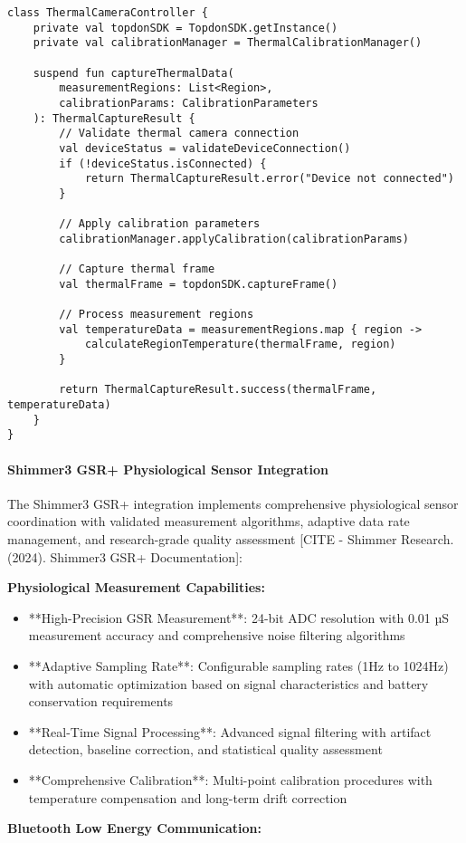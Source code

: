\documentclass[11pt,a4paper]{report}
\begin{document}
\begin{verbatim}
class ThermalCameraController {
    private val topdonSDK = TopdonSDK.getInstance()
    private val calibrationManager = ThermalCalibrationManager()

    suspend fun captureThermalData(
        measurementRegions: List<Region>,
        calibrationParams: CalibrationParameters
    ): ThermalCaptureResult {
        // Validate thermal camera connection
        val deviceStatus = validateDeviceConnection()
        if (!deviceStatus.isConnected) {
            return ThermalCaptureResult.error("Device not connected")
        }

        // Apply calibration parameters
        calibrationManager.applyCalibration(calibrationParams)

        // Capture thermal frame
        val thermalFrame = topdonSDK.captureFrame()

        // Process measurement regions
        val temperatureData = measurementRegions.map { region ->
            calculateRegionTemperature(thermalFrame, region)
        }

        return ThermalCaptureResult.success(thermalFrame, temperatureData)
    }
}
\end{verbatim}

\paragraph{Shimmer3 GSR+ Physiological Sensor Integration}

The Shimmer3 GSR+ integration implements comprehensive physiological sensor coordination with validated measurement
algorithms, adaptive data rate management, and research-grade quality
assessment [CITE - Shimmer Research. (2024). Shimmer3 GSR+ Documentation]:

\textbf{Physiological Measurement Capabilities:}

\begin{itemize}
\item **High-Precision GSR Measurement**: 24-bit ADC resolution with 0.01 µS measurement accuracy and comprehensive noise
  filtering algorithms
\item **Adaptive Sampling Rate**: Configurable sampling rates (1Hz to 1024Hz) with automatic optimization based on signal
  characteristics and battery conservation requirements
\item **Real-Time Signal Processing**: Advanced signal filtering with artifact detection, baseline correction, and
  statistical quality assessment
\item **Comprehensive Calibration**: Multi-point calibration procedures with temperature compensation and long-term drift
  correction

\end{itemize}
\textbf{Bluetooth Low Energy Communication:}
\end{document}
